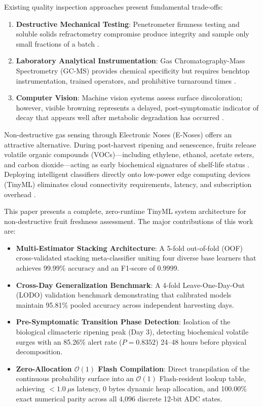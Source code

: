\documentclass[conference]{IEEEtran}
\begin{document}
Existing quality inspection approaches present fundamental trade-offs:
\begin{enumerate}
    \item \textbf{Destructive Mechanical Testing}: Penetrometer firmness testing and soluble solids refractometry compromise produce integrity and sample only small fractions of a batch \cite{nicolai2007}.
    \item \textbf{Laboratory Analytical Instrumentation}: Gas Chromatography-Mass Spectrometry (GC-MS) provides chemical specificity but requires benchtop instrumentation, trained operators, and prohibitive turnaround times \cite{grassi2022}.
    \item \textbf{Computer Vision}: Machine vision systems assess surface discoloration; however, visible browning represents a delayed, post-symptomatic indicator of decay that appears well after metabolic degradation has occurred \cite{blasco2021}.
\end{enumerate}

Non-destructive gas sensing through Electronic Noses (E-Noses) offers an attractive alternative. During post-harvest ripening and senescence, fruits release volatile organic compounds (VOCs)---including ethylene, ethanol, acetate esters, and carbon dioxide---acting as early biochemical signatures of shelf-life status \cite{arshak2004}. Deploying intelligent classifiers directly onto low-power edge computing devices (TinyML) eliminates cloud connectivity requirements, latency, and subscription overhead \cite{banbury2021}. 

This paper presents a complete, zero-runtime TinyML system architecture for non-destructive fruit freshness assessment. The major contributions of this work are:
\begin{itemize}
    \item \textbf{Multi-Estimator Stacking Architecture}: A 5-fold out-of-fold (OOF) cross-validated stacking meta-classifier uniting four diverse base learners that achieves 99.99\% accuracy and an F1-score of 0.9999.
    \item \textbf{Cross-Day Generalization Benchmark}: A 4-fold Leave-One-Day-Out (LODO) validation benchmark demonstrating that calibrated models maintain 95.81\% pooled accuracy across independent harvesting days.
    \item \textbf{Pre-Symptomatic Transition Phase Detection}: Isolation of the biological climacteric ripening peak (Day 3), detecting biochemical volatile surges with an 85.26\% alert rate ($P = 0.8352$) 24--48 hours before physical decomposition.
    \item \textbf{Zero-Allocation $\mathcal{O}(1)$ Flash Compilation}: Direct transpilation of the continuous probability surface into an $\mathcal{O}(1)$ Flash-resident lookup table, achieving $< 1.0\ \mu\text{s}$ latency, 0 bytes dynamic heap allocation, and 100.00\% exact numerical parity across all 4,096 discrete 12-bit ADC states.
\end{itemize}
\end{document}
